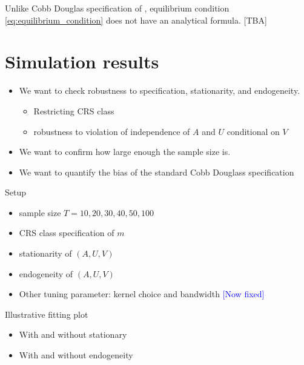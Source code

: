 \documentclass[12pt]{article}
\begin{document}
Unlike Cobb Douglas specification of \cite{csahin2014mismatch}, equilibrium condition \eqref{eq:equilibrium_condition} does not have an analytical formula. [TBA]


\section{Simulation results}\label{sec:monte_carlo}

\begin{itemize}
    \item We want to check robustness to specification, stationarity, and endogeneity.
    \begin{itemize}
        \item Restricting CRS class
        \item robustness to violation of independence of $A$ and $U$ conditional on $V$
    \end{itemize}
    \item We want to confirm how large enough the sample size is.
    \item We want to quantify the bias of the standard Cobb Douglass specification 
\end{itemize}
\begin{frame}{Setup}
    \begin{itemize}
    \item sample size $T=10,20,30,40,50,100$
    \item CRS class specification of $m$
    \item stationarity of $(A,U,V)$
    \item endogeneity of $(A,U,V)$
    \item Other tuning parameter: kernel choice and bandwidth  \textcolor{blue}{[Now fixed]}
\end{itemize}
\end{frame}

\begin{frame}{Illustrative fitting plot}
\begin{itemize}
    \item With and without stationary
    \item With and without endogeneity
\end{itemize}
    
\end{frame}
\end{document}
